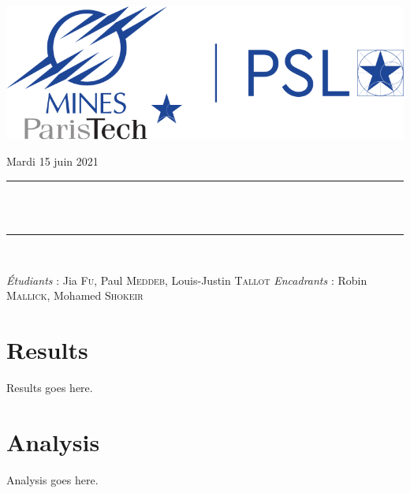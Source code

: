 \documentclass[12pt,oneside,oldfontcommands]{memoir}
\makeatletter
\def\maketitle{%
  \null
  \thispagestyle{empty}
  \begin{center}\leavevmode
       \vskip 2cm
       \normalfont
       \includegraphics[width=0.5\columnwidth]{logo_mines.png}
       \vskip 1cm
	     {\large Mardi 15 juin 2021\par}
       \vskip 1.0cm
	\rule{\linewidth}{0.2 mm} \\[0.4 cm]
	{ \huge \bfseries \@title}\\
	\rule{\linewidth}{0.2 mm} \\[1.5 cm]
	
	\vspace{1cm}
	
	\Large{\emph{Étudiants} : Jia \textsc{Fu}, Paul \textsc{Meddeb}, Louis-Justin \textsc{Tallot}}
	\vspace{0.5cm}
	\Large{\emph{Encadrants} : Robin \textsc{Mallick}, Mohamed \textsc{Shokeir}}
	
   \end{center}
   \vfill
   \null
   \cleardoublepage
  }
\makeatother
\begin{document}
\maketitle
\frontmatter
\let\cleardoublepage\clearpage
\mainmatter
\sloppy







\section*{Results}
Results goes here. 


\section*{Analysis}
Analysis goes here. 
\end{document}
